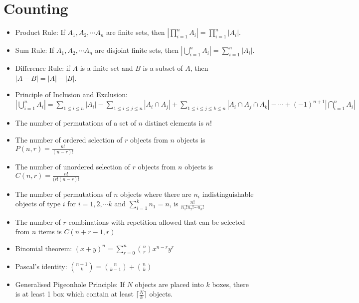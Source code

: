 \documentclass[11pt, twocolumn]{article}
\newenvironment{compactitem}
{\begin{itemize}
  \setlength{\itemsep}{1px}
  \setlength{\parskip}{0pt}
  \setlength{\parsep}{0pt}}
{\end{itemize}}
\begin{document}
\section{Counting}
\begin{compactitem}
\item Product Rule: If $A_1, A_2, \cdots A_n$ are finite sets, then $|\prod_{i=1}^n A_i| = \prod_{i=1}^n|A_i|$.
\item Sum Rule: If $A_1, A_2, \cdots A_n$ are disjoint finite sets, then $|\bigcup_{i=1}^n A_i| = \sum_{i=1}^n|A_i|$.
\item Difference Rule: if $A$ is a finite set and $B$ is a subset of $A$, then $|A-B| = |A|-|B|$.
\item Principle of Inclusion and Exclusion: $|\bigcup_{i=1}^n A_i| = \sum_{1\leq i\leq n}|A_i|-\sum_{1\leq i\leq j\leq n}|A_i\cap A_j|+\sum_{1\leq i\leq j \leq k \leq n}|A_i\cap A_j\cap A_k|-\cdots +(-1)^{n+1}|\bigcap_{i=1}^n A_i|$
\item The number of permutations of a set of $n$ distinct elements is $n!$
\item The number of ordered selection of $r$ objects from $n$ objects is $P(n, r)=\frac{n!}{(n-r)!}$
\item The number of unordered selection of $r$ objects from $n$ objects is $C(n,r) = \frac{n!}{(r!(n-r)!}$
\item The number of permutations of $n$ objects where there are $n_i$ indistinguishable objects of type $i$ for $i=1, 2, \cdots k$ and $\sum_{i=1}^{k} n_1 = n$, is $\frac{n!}{n_1!n_2!\cdots n_k!}$ 
\item The number of $r$-combinations with repetition allowed that can be selected from $n$ items is $C(n+r-1, r)$
\item Binomial theorem: $(x+y)^n = \sum^n_{r=0} \binom{n}{r}x^{n-r}y^r$
\item Pascal's identity: $\binom{n+1}{k} = \binom{n}{k-1} + \binom{n}{k}$
\item Generalised Pigeonhole Principle: If $N$ objects are placed into $k$ boxes, there is at least 1 box which contain at least $\lceil \frac{N}{k} \rceil$ objects.
\end{compactitem}
\end{document}
